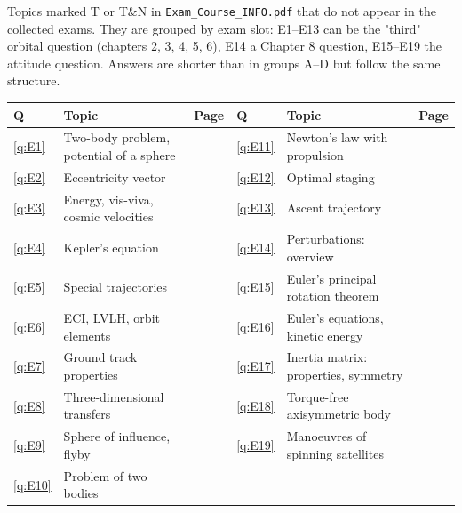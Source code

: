 
Topics marked T or T\&N in \texttt{Exam\_Course\_INFO.pdf} that do not appear in the collected exams. They are grouped by
exam slot: E1--E13 can be the "third" orbital question (chapters 2, 3, 4, 5, 6), E14 a Chapter 8 question, E15--E19 the
attitude question. Answers are shorter than in groups A--D but follow the same structure.

\begin{center}
\small
\begin{tabular}{@{}llr@{\hspace{1.2em}}llr@{}}
\toprule
Q & Topic & Page & Q & Topic & Page\\
\midrule
\ref{q:E1} & Two-body problem, potential of a sphere & \pageref{q:E1} & \ref{q:E11} & Newton's law with propulsion & \pageref{q:E11}\\
\ref{q:E2} & Eccentricity vector & \pageref{q:E2} & \ref{q:E12} & Optimal staging & \pageref{q:E12}\\
\ref{q:E3} & Energy, vis-viva, cosmic velocities & \pageref{q:E3} & \ref{q:E13} & Ascent trajectory & \pageref{q:E13}\\
\ref{q:E4} & Kepler's equation & \pageref{q:E4} & \ref{q:E14} & Perturbations: overview & \pageref{q:E14}\\
\ref{q:E5} & Special trajectories & \pageref{q:E5} & \ref{q:E15} & Euler's principal rotation theorem & \pageref{q:E15}\\
\ref{q:E6} & ECI, LVLH, orbit elements & \pageref{q:E6} & \ref{q:E16} & Euler's equations, kinetic energy & \pageref{q:E16}\\
\ref{q:E7} & Ground track properties & \pageref{q:E7} & \ref{q:E17} & Inertia matrix: properties, symmetry & \pageref{q:E17}\\
\ref{q:E8} & Three-dimensional transfers & \pageref{q:E8} & \ref{q:E18} & Torque-free axisymmetric body & \pageref{q:E18}\\
\ref{q:E9} & Sphere of influence, flyby & \pageref{q:E9} & \ref{q:E19} & Manoeuvres of spinning satellites & \pageref{q:E19}\\
\ref{q:E10} & Problem of two bodies & \pageref{q:E10} & & & \\
\bottomrule
\end{tabular}
\end{center}

